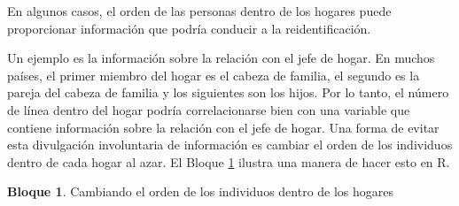 \documentclass[
]{book}
\newenvironment{Shaded}{\begin{snugshade}}{\end{snugshade}}
\newcommand{\CommentTok}[1]{\textcolor[rgb]{0.56,0.35,0.01}{\textit{#1}}}
\newcommand{\DecValTok}[1]{\textcolor[rgb]{0.00,0.00,0.81}{#1}}
\newcommand{\FunctionTok}[1]{\textcolor[rgb]{0.00,0.00,0.00}{#1}}
\newcommand{\NormalTok}[1]{#1}
\newcommand{\OtherTok}[1]{\textcolor[rgb]{0.56,0.35,0.01}{#1}}
\newcommand{\SpecialCharTok}[1]{\textcolor[rgb]{0.00,0.00,0.00}{#1}}
\theoremstyle{definition}
\theoremstyle{definition}
\newtheorem{example}{Bloque}[chapter]
\theoremstyle{definition}
\theoremstyle{definition}
\theoremstyle{remark}
\begin{document}
\begin{Shaded}
\end{Shaded}

En algunos casos, el orden de las personas dentro de los hogares puede proporcionar información que podría conducir a la reidentificación.

Un ejemplo es la información sobre la relación con el jefe de hogar. En muchos países, el primer miembro del hogar es el cabeza de familia, el segundo es la pareja del cabeza de familia y los siguientes son los hijos. Por lo tanto, el número de línea dentro del hogar podría correlacionarse bien con una variable que contiene información sobre la relación con el jefe de hogar. Una forma de evitar esta divulgación involuntaria de información es cambiar el orden de los individuos dentro de cada hogar al azar. El Bloque \ref{exm:bloqueMicro15} ilustra una manera de hacer esto en R.

\begin{example}
\protect\hypertarget{exm:bloqueMicro15}{}\label{exm:bloqueMicro15}Cambiando el orden de los individuos dentro de los hogares
\end{example}
\end{document}
